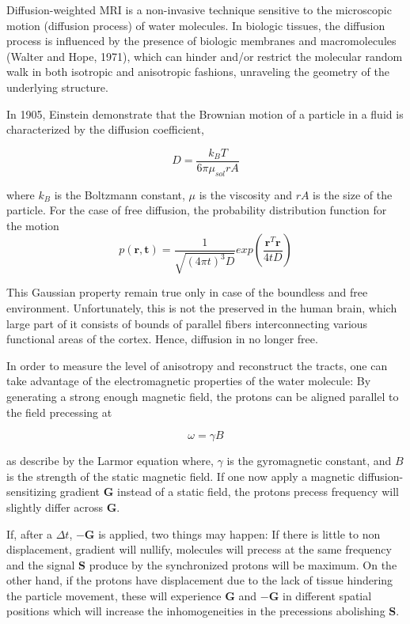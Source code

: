 \documentclass{cys}
\begin{document}
\bigskip Diffusion-weighted MRI is a non-invasive technique sensitive to the microscopic motion (diffusion process) of water molecules. In biologic tissues, the diffusion process is influenced by the presence of biologic membranes and macromolecules (Walter and Hope, 1971), which can hinder and/or restrict the molecular random walk in both isotropic and anisotropic fashions, unraveling the geometry of the underlying structure. 

\bigskip
In 1905, Einstein demonstrate that the Brownian motion of a particle in a fluid is characterized by the diffusion coefficient,

\begin{equation}
D=\frac{k_BT}{6\pi\mu_{sol}rA}
\end{equation}  

where $k_B$ is the Boltzmann constant, $\mu$ is the viscosity and $rA$ is the size of the particle. For the case of free diffusion, the probability distribution function for the motion 
\begin{equation}
p(\mathbf{r,t})=\frac{1}{\sqrt{(4\pi t)^3D}}exp\left( \frac{\mathbf{r}^T\mathbf{r}}{4tD} \right)
\end{equation}

This Gaussian property remain true only in case of the boundless and free environment. Unfortunately, this is not the preserved in the human brain, which large part of it consists of bounds of parallel fibers interconnecting various functional areas of the cortex. Hence, diffusion in no longer free.

\bigskip
In order to measure the level of anisotropy and reconstruct the tracts, one can take advantage of the electromagnetic properties of the water molecule: By generating a strong enough magnetic field, the protons can be aligned parallel to the field precessing at 

\begin{equation}
\omega = \gamma B
\end{equation}

as describe by the Larmor equation where, $\gamma$ is the gyromagnetic constant, and $B$ is the strength of the static magnetic field. If one now apply a magnetic diffusion-sensitizing gradient $\mathbf{G}$ instead of a static field, the protons precess frequency will slightly differ across $\mathbf{G}$.

\bigskip
If, after a $\Delta t$, $-\mathbf{G}$ is applied, two things may happen: If there is little to non displacement, gradient will nullify, molecules will precess at the same frequency and the signal $\mathbf{S}$ produce by the synchronized protons will be maximum. On the other hand, if the protons have displacement due to the lack of tissue hindering the particle movement, these will experience $\mathbf{G}$ and $-\mathbf{G}$ in different spatial positions which will increase the inhomogeneities in the precessions abolishing $\mathbf{S}$. 
\end{document}
